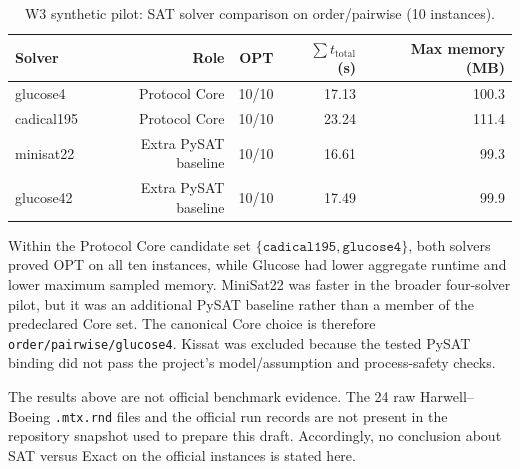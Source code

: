 \begin{table}[t]
\centering
\caption{W3 synthetic pilot: SAT solver comparison on order/pairwise
(10 instances).}
\label{tab:sat-rq2-pilot}
\begin{tabular}{lrrrr}
\hline
Solver & Role & OPT & $\sum t_{\mathrm{total}}$ (s) &
Max memory (MB)\\
\hline
glucose4 & Protocol Core & 10/10 & 17.13 & 100.3\\
cadical195 & Protocol Core & 10/10 & 23.24 & 111.4\\
minisat22 & Extra PySAT baseline & 10/10 & 16.61 & 99.3\\
glucose42 & Extra PySAT baseline & 10/10 & 17.49 & 99.9\\
\hline
\end{tabular}
\end{table}

Within the Protocol Core candidate set
$\{\texttt{cadical195},\texttt{glucose4}\}$, both solvers proved OPT on all ten
instances, while Glucose had lower aggregate runtime and lower maximum
sampled memory. MiniSat22 was faster in the broader four-solver pilot, but it
was an additional PySAT baseline rather than a member of the predeclared Core
set. The canonical Core choice is therefore
\texttt{order/pairwise/glucose4}. Kissat was excluded because the tested
PySAT binding did not pass the project's model/assumption and process-safety
checks.

The results above are not official benchmark evidence. The 24 raw
Harwell--Boeing \texttt{.mtx.rnd} files and the official run records are not
present in the repository snapshot used to prepare this draft. Accordingly,
no conclusion about SAT versus Exact on the official instances is stated here.
